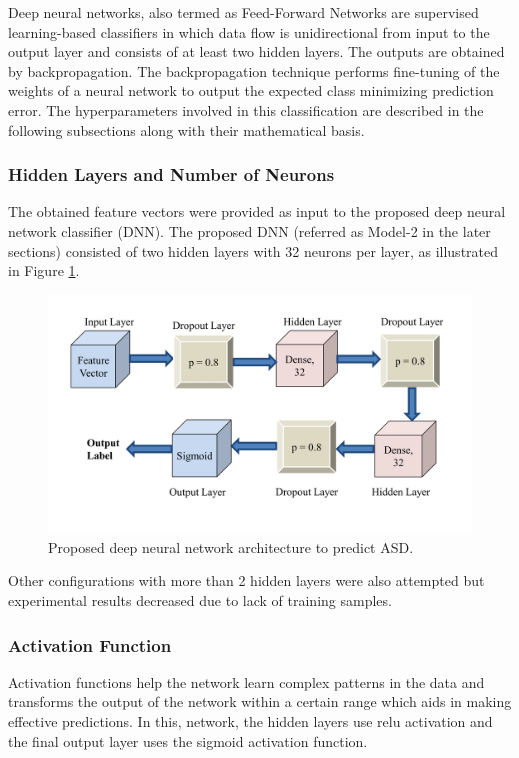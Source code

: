 Deep neural networks, also termed as Feed-Forward Networks are supervised learning-based
classifiers in which data flow is unidirectional from input to the output layer and consists of
at least two hidden layers. The outputs are obtained by backpropagation. The
backpropagation technique performs fine-tuning of the weights of a neural network to output
the expected class minimizing prediction error. The hyperparameters involved in this
classification are described in the following subsections along with their mathematical basis.

\subsubsection{Hidden Layers and Number of Neurons}
The obtained feature vectors were provided as input to the proposed deep neural network classifier (DNN). The proposed DNN (referred as Model-2 in the later sections) consisted of two hidden layers with 32 neurons per layer, as illustrated in Figure \ref{fig:3.8}.

\begin{figure}[hbt!]
\centering
\includegraphics[scale=0.5]{figures/Figure 3.8.png}
\caption{Proposed deep neural network architecture to predict ASD.}
\label{fig:3.8}
\end{figure}

Other configurations with more than 2 hidden
layers were also attempted but experimental results decreased due to lack of training samples.

\subsubsection{Activation Function}

Activation functions help the network learn complex patterns in the data and transforms the
output of the network within a certain range which aids in making effective predictions. In
this, network, the hidden layers use relu activation and the final output layer uses the sigmoid
activation function.\\


